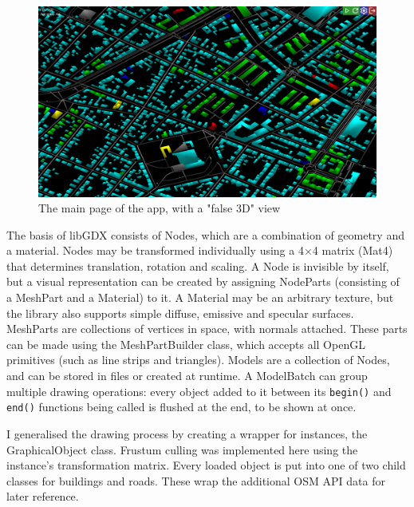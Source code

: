 \begin{figure}[!ht]
    \centering
    \includegraphics[width=150mm, keepaspectratio]{images/main_graphics_view.png}
    \caption{The main page of the app, with a "false 3D" view}
\end{figure}

The basis of libGDX consists of Nodes, which are a combination of geometry and a material. Nodes may be transformed individually using a 4$\times$4 matrix (Mat4) that determines translation, rotation and scaling. A Node is invisible by itself, but a visual representation can be created by assigning NodeParts (consisting of a MeshPart and a Material) to it. A Material may be an arbitrary texture, but the library also supports simple diffuse, emissive and specular surfaces. MeshParts are collections of vertices in space, with normals attached. These parts can be made using the MeshPartBuilder class, which accepts all OpenGL primitives (such as line strips and triangles). Models are a collection of Nodes, and can be stored in files or created at runtime. A ModelBatch can group multiple drawing operations: every object added to it between its \verb|begin()| and \verb|end()| functions being called is flushed at the end, to be shown at once.


I generalised the drawing process by creating a wrapper for instances, the GraphicalObject class. Frustum culling was implemented here using the instance's transformation matrix. Every loaded object is put into one of two child classes for buildings and roads. These wrap the additional OSM API data for later reference.

